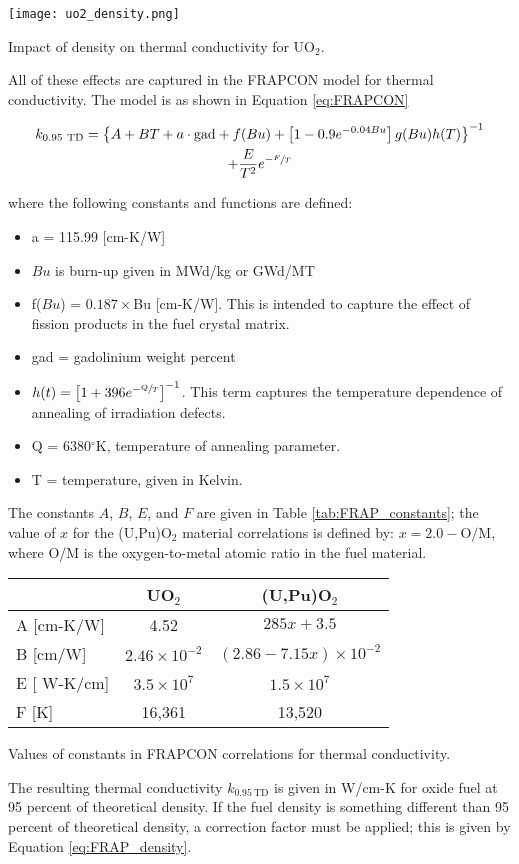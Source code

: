 \begin{marginfigure}
\texttt{[image: uo2\_density.png]}
\caption{Impact of density on thermal conductivity for UO$_{2}$.}
\label{fig:uo2_density}
\end{marginfigure}

All of these effects are captured in the FRAPCON model for thermal conductivity.  The model is as shown in Equation \ref{eq:FRAPCON}


\begin{multline}
k_{0.95 \ \text{TD}} = \left\{A + BT + a \cdot \text{gad} + f(Bu) +  \left[1-0.9e^{-0.04 Bu} \right]g(Bu)h(T) \right\}^{-1} \\ + \frac{E}{T^2}e^{-\sfrac{F}{T}}
\label{eq:FRAPCON}
\end{multline}

where the following constants and functions are defined:
\begin{itemize}
\item a = 115.99 [cm-K/W]
\item $Bu$ is burn-up given in MWd/kg or GWd/MT
\item f($Bu$) = $0.187\times $Bu [cm-K/W].  This is intended to capture the effect of fission products in the fuel crystal matrix.
\item gad = gadolinium weight percent
\item $h(t) = \left[1 + 396 e^{-\sfrac{Q}{T}} \right]^{-1}$.  This term captures the temperature dependence of annealing of irradiation defects.
\item Q = 6380$^{\circ}$K, temperature of annealing parameter.
\item T = temperature, given in Kelvin.
\end{itemize}
The constants $A$, $B$, $E$, and $F$ are given in Table \ref{tab:FRAP_constants}; the value of $x$ for the (U,Pu)O$_2$ material correlations is defined by: $x = 2.0 - \text{O/M}$, where O/M is the oxygen-to-metal atomic ratio in the fuel material.

\begin{margintable}
\begin{tabular}{l c c}
\toprule
   & UO$_2$ & (U,Pu)O$_2$ \\
\midrule
A [cm-K/W] & 4.52 & $285x+3.5$ \\
B [cm/W] & $2.46 \times 10^{-2}$ & $\left(2.86 - 7.15x\right)\times 10^{-2}$ \\
E [ W-K/cm] & $3.5\times 10^7$ & $1.5\times 10^7$ \\
F [K] & 16,361 & 13,520 \\
\bottomrule
\end{tabular}
\caption{Values of constants in FRAPCON correlations for thermal conductivity.}
\label{tab:FRAP_constants}
\end{margintable}
The resulting thermal conductivity $k_{0.95 \ \text{TD}}$ is given in W/cm-K for oxide fuel at 95 percent of theoretical density.  If the fuel density is something different than 95 percent of theoretical density, a correction factor must be applied; this is given by Equation \ref{eq:FRAP_density}.


